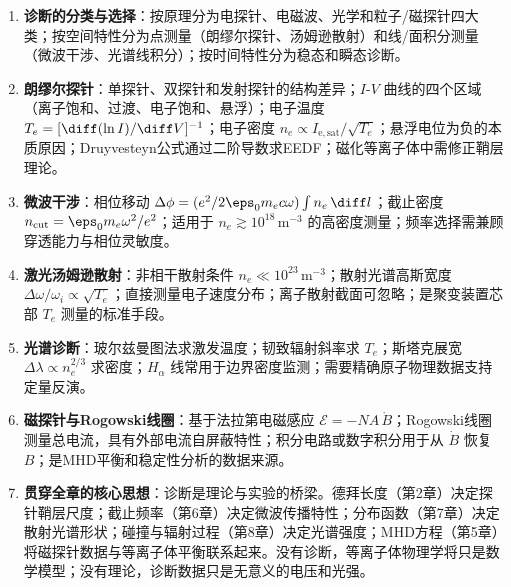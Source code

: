 \begin{chapterreview}
\begin{enumerate}
    \item \textbf{诊断的分类与选择}：按原理分为电探针、电磁波、光学和粒子/磁探针四大类；按空间特性分为点测量（朗缪尔探针、汤姆逊散射）和线/面积分测量（微波干涉、光谱线积分）；按时间特性分为稳态和瞬态诊断。
    
    \item \textbf{朗缪尔探针}：单探针、双探针和发射探针的结构差异；$I$-$V$ 曲线的四个区域（离子饱和、过渡、电子饱和、悬浮）；电子温度 $T_e = [\diff(\ln I)/\diff V]^{-1}$；电子密度 $n_e \propto I_{\mathrm{e,sat}}/\sqrt{T_e}$；悬浮电位为负的本质原因；Druyvesteyn公式通过二阶导数求EEDF；磁化等离子体中需修正鞘层理论。
    
    \item \textbf{微波干涉}：相位移动 $\Delta\phi = (e^2/2\eps_0 m_e c\omega) \int n_e\,\diff l$；截止密度 $n_{\mathrm{cut}} = \eps_0 m_e \omega^2/e^2$；适用于 $n_e \gtrsim 10^{18}\,\mathrm{m}^{-3}$ 的高密度测量；频率选择需兼顾穿透能力与相位灵敏度。
    
    \item \textbf{激光汤姆逊散射}：非相干散射条件 $n_e \ll 10^{23}\,\mathrm{m}^{-3}$；散射光谱高斯宽度 $\Delta\omega/\omega_i \propto \sqrt{T_e}$；直接测量电子速度分布；离子散射截面可忽略；是聚变装置芯部 $T_e$ 测量的标准手段。
    
    \item \textbf{光谱诊断}：玻尔兹曼图法求激发温度；韧致辐射斜率求 $T_e$；斯塔克展宽 $\Delta\lambda \propto n_e^{2/3}$ 求密度；$H_\alpha$ 线常用于边界密度监测；需要精确原子物理数据支持定量反演。
    
    \item \textbf{磁探针与Rogowski线圈}：基于法拉第电磁感应 $\mathcal{E} = -N A\,\dot{B}$；Rogowski线圈测量总电流，具有外部电流自屏蔽特性；积分电路或数字积分用于从 $\dot{B}$ 恢复 $B$；是MHD平衡和稳定性分析的数据来源。
    
    \item \textbf{贯穿全章的核心思想}：诊断是理论与实验的桥梁。德拜长度（第2章）决定探针鞘层尺度；截止频率（第6章）决定微波传播特性；分布函数（第7章）决定散射光谱形状；碰撞与辐射过程（第8章）决定光谱强度；MHD方程（第5章）将磁探针数据与等离子体平衡联系起来。没有诊断，等离子体物理学将只是数学模型；没有理论，诊断数据只是无意义的电压和光强。
\end{enumerate}
\end{chapterreview}

\newpage
